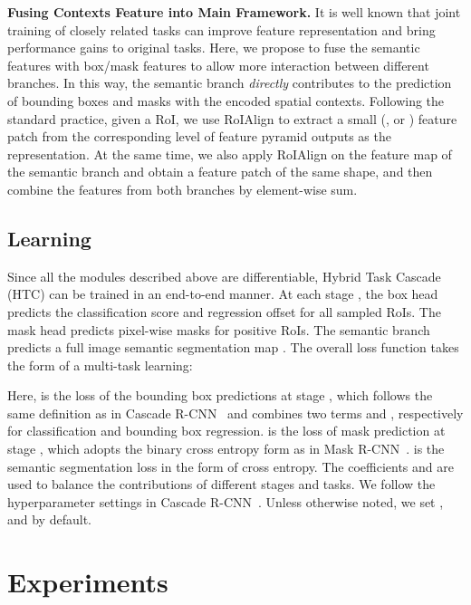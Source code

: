 \documentclass[10pt,twocolumn,letterpaper]{article}
\begin{document}
\vspace{0.1cm}
\noindent
\textbf{Fusing Contexts Feature into Main Framework.}
It is well known that joint training of closely related tasks can improve
feature representation and bring performance gains to original tasks.
Here, we propose to fuse the semantic features with box/mask features to allow
more interaction between different branches. In this way, the semantic branch
\emph{directly} contributes to the prediction of bounding boxes and masks
with the encoded spatial contexts.
Following the standard practice, given a RoI, we use RoIAlign to extract
a small (\eg,  or ) feature patch from the corresponding
level of feature pyramid outputs as the representation. At the same time, we
also apply RoIAlign on the feature map of the semantic branch and obtain
a feature patch of the same shape, and then combine the features from both
branches by element-wise sum.

\subsection{Learning}
\label{subsec:training}

Since all the modules described above are differentiable, Hybrid Task Cascade
(HTC) can be trained in an end-to-end manner. At each stage , the box head
predicts the classification score  and regression offset  for all
sampled RoIs. The mask head predicts pixel-wise masks  for positive RoIs.
The semantic branch predicts a full image semantic segmentation map .
The overall loss function takes the form of a multi-task learning:

Here,
 is the loss of the bounding box predictions at stage , which
follows the same definition as in Cascade R-CNN~\cite{cai18cascadercnn} and combines two
terms  and , respectively for classification and bounding
box regression.
 is the loss of mask prediction at stage ,
which adopts the binary cross entropy form as in Mask R-CNN~\cite{he2017mask}.
 is the semantic segmentation loss in the form of cross entropy.
The coefficients  and  are used to balance the contributions
of different stages and tasks.
We follow the hyperparameter settings in Cascade R-CNN~\cite{cai18cascadercnn}.
Unless otherwise noted, we set ,  and
 by default.
 

\section{Experiments}
\label{sec:experiments}
\end{document}
